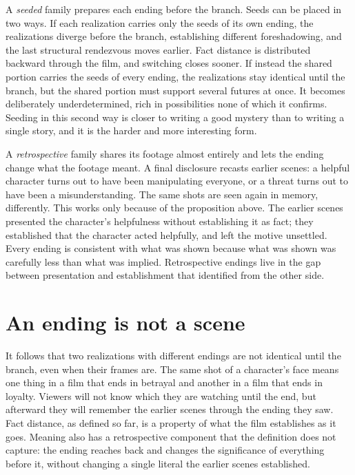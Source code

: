 A \emph{seeded} family prepares each ending before the branch. Seeds can be placed in two ways. If each realization carries only the seeds of its own ending, the realizations diverge before the branch, establishing different foreshadowing, and the last structural rendezvous moves earlier. Fact distance is distributed backward through the film, and switching closes sooner. If instead the shared portion carries the seeds of every ending, the realizations stay identical until the branch, but the shared portion must support several futures at once. It becomes deliberately underdetermined, rich in possibilities none of which it confirms. Seeding in this second way is closer to writing a good mystery than to writing a single story, and it is the harder and more interesting form.

A \emph{retrospective} family shares its footage almost entirely and lets the ending change what the footage meant. A final disclosure recasts earlier scenes: a helpful character turns out to have been manipulating everyone, or a threat turns out to have been a misunderstanding. The same shots are seen again in memory, differently. This works only because of the proposition above. The earlier scenes presented the character's helpfulness without establishing it as fact; they established that the character acted helpfully, and left the motive unsettled. Every ending is consistent with what was shown because what was shown was carefully less than what was implied. Retrospective endings live in the gap between presentation and establishment that  identified from the other side.

\section{An ending is not a scene}

It follows that two realizations with different endings are not identical until the branch, even when their frames are. The same shot of a character's face means one thing in a film that ends in betrayal and another in a film that ends in loyalty. Viewers will not know which they are watching until the end, but afterward they will remember the earlier scenes through the ending they saw. Fact distance, as defined so far, is a property of what the film establishes as it goes. Meaning also has a retrospective component that the definition does not capture: the ending reaches back and changes the significance of everything before it, without changing a single literal the earlier scenes established.

